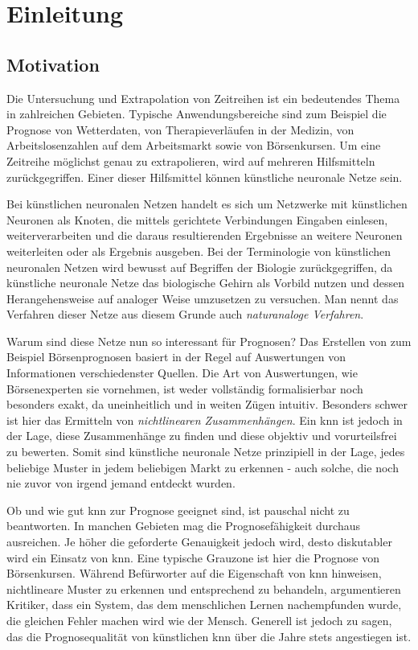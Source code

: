 \chapter{Einleitung}
\label{chapter:Einleitung}

\section{Motivation}
\label{section:Motivation}
Die Untersuchung und Extrapolation von Zeitreihen ist ein bedeutendes Thema in zahlreichen Gebieten. Typische Anwendungsbereiche sind zum Beispiel die Prognose von Wetterdaten, von Therapieverläufen in der  Medizin, von Arbeitslosenzahlen auf dem Arbeitsmarkt sowie von Börsenkursen. Um eine Zeitreihe möglichst genau zu extrapolieren, wird auf mehreren Hilfsmitteln zurückgegriffen. Einer dieser Hilfsmittel können künstliche neuronale Netze sein. 

Bei künstlichen neuronalen Netzen handelt es sich um Netzwerke mit künstlichen Neuronen als Knoten, die mittels gerichtete Verbindungen Eingaben einlesen, weiterverarbeiten und die daraus resultierenden Ergebnisse an weitere Neuronen weiterleiten oder als Ergebnis ausgeben. Bei der Terminologie von künstlichen neuronalen Netzen wird bewusst auf Begriffen der Biologie zurückgegriffen, da künstliche neuronale Netze das biologische Gehirn als Vorbild nutzen und dessen Herangehensweise auf analoger Weise umzusetzen zu versuchen. Man nennt das Verfahren dieser Netze aus diesem Grunde auch \textit{naturanaloge Verfahren}.

Warum sind diese Netze nun so interessant für Prognosen? Das Erstellen von zum Beispiel Börsenprognosen basiert in der Regel auf Auswertungen von Informationen verschiedenster Quellen. Die Art von Auswertungen, wie Börsenexperten sie vornehmen, ist weder vollständig formalisierbar noch besonders exakt, da uneinheitlich und in weiten Zügen intuitiv. Besonders schwer ist hier das Ermitteln von \textit{nichtlinearen Zusammenhängen}. Ein \ac{knn} ist jedoch in der Lage, diese Zusammenhänge zu finden  und diese objektiv und vorurteilsfrei zu bewerten. Somit sind künstliche neuronale Netze prinzipiell in der Lage, jedes beliebige Muster in jedem beliebigen Markt zu erkennen - auch solche, die noch nie zuvor von irgend jemand entdeckt wurden.

Ob und wie gut \ac{knn} zur Prognose geeignet sind, ist pauschal nicht zu beantworten. In manchen Gebieten mag die Prognosefähigkeit durchaus ausreichen. Je höher die geforderte Genauigkeit jedoch wird, desto diskutabler wird ein Einsatz von \ac{knn}. Eine typische Grauzone ist hier die Prognose von Börsenkursen. Während Befürworter auf die Eigenschaft von \ac{knn} hinweisen, nichtlineare Muster zu erkennen und entsprechend zu behandeln, argumentieren Kritiker, dass ein System, das dem menschlichen Lernen nachempfunden wurde, die gleichen Fehler machen wird wie der Mensch. Generell ist jedoch zu sagen, das die Prognosequalität von künstlichen \ac{knn} über die Jahre stets angestiegen ist.

